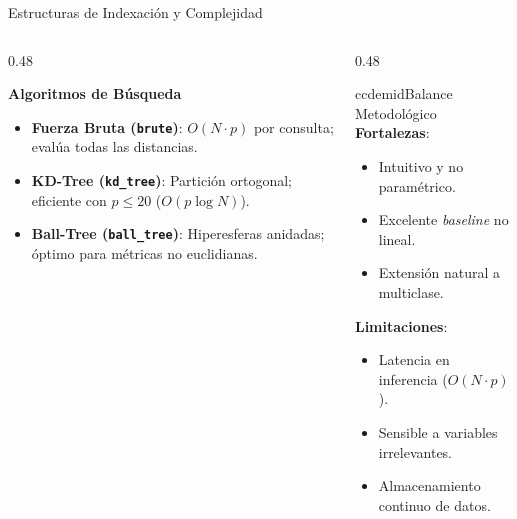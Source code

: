\begin{frame}{Estructuras de Indexación y Complejidad}
\begin{columns}[T,onlytextwidth]
\begin{column}{0.48\textwidth}
\begin{ccdebox}
\scriptsize
\textbf{Algoritmos de Búsqueda}
\begin{itemize}\setlength{\itemsep}{0.08em}
  \item \textbf{Fuerza Bruta (\texttt{brute})}: $O(N \cdot p)$ por consulta; evalúa todas las distancias.
  \item \textbf{KD-Tree (\texttt{kd\_tree})}: Partición ortogonal; eficiente con $p \le 20$ ($O(p \log N)$).
  \item \textbf{Ball-Tree (\texttt{ball\_tree})}: Hiperesferas anidadas; óptimo para métricas no euclidianas.
\end{itemize}
\end{ccdebox}
\end{column}

\begin{column}{0.48\textwidth}
\begin{contrastbox}{ccdemid}{Balance Metodológico}
\scriptsize
\textbf{Fortalezas}:
\begin{itemize}\setlength{\itemsep}{0.05em}
  \item Intuitivo y no paramétrico.
  \item Excelente \textit{baseline} no lineal.
  \item Extensión natural a multiclase.
\end{itemize}
\textbf{Limitaciones}:
\begin{itemize}\setlength{\itemsep}{0.05em}
  \item Latencia en inferencia ($O(N \cdot p)$).
  \item Sensible a variables irrelevantes.
  \item Almacenamiento continuo de datos.
\end{itemize}
\end{contrastbox}
\end{column}
\end{columns}
\end{frame}
